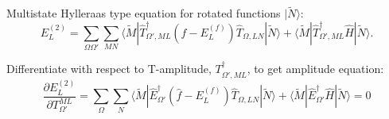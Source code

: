 \documentclass[12pt]{article}
\begin{document}
Multistate Hylleraas type equation for rotated functions $| \tilde{N} \rangle$:
\begin{equation}
E_{L}^{(2)} = \sum_{\Omega\Omega '} \sum_{MN} \langle \tilde{M}  | \hat{T}^{\dagger}_{\Omega ',ML} ( \hat{f} -E^{(f)}_{L} ) \hat{T}_{\Omega,LN} | \tilde{N} \rangle
+ \langle \tilde{M} | \hat{T}^{\dagger}_{\Omega ',ML} \hat{H} | \tilde{N} \rangle.
\end{equation}

Differentiate with respect to T-amplitude, $T^{\dagger}_{\Omega ',ML} $, to get amplitude equation:  
\begin{equation}
\frac{\partial E_{L}^{(2)}}{\partial T^{ML}_{\Omega '}}  =
 \sum_{\Omega} \sum_{N} \langle \tilde{M}  | \hat{E}^{\dagger}_{\Omega '} ( \hat{f} -E^{(f)}_{L} ) \hat{T}_{\Omega,LN} | \tilde{N} \rangle
+ \langle \tilde{M} | \hat{E}^{\dagger}_{\Omega'} \hat{H} | \tilde{N} \rangle = 0
\end{equation}
\end{document}
